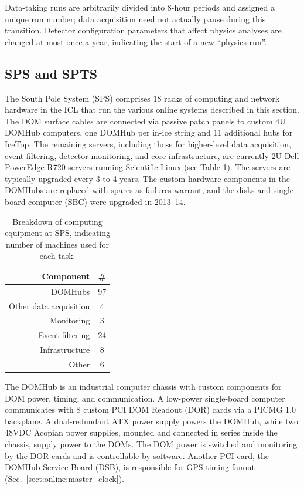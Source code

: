 Data-taking runs are arbitrarily divided into 8-hour periods and assigned
a unique run number; data acquisition need not actually pause during
this transition.  Detector configuration parameters that affect physics
analyses are changed at most once a year, indicating the start of a new
``physics run''.   

\subsection{\label{sect:sps}SPS and SPTS}

The South Pole System (SPS) comprises 18 racks of computing and network
hardware in the ICL that run the various online systems described in this
section.  The DOM surface cables are connected via passive patch panels to
custom 4U DOMHub computers, one DOMHub per in-ice string and 11 additional
hubs for IceTop.  The remaining servers, including those for higher-level
data acquisition, event filtering, detector monitoring, and core
infrastructure, are currently 2U Dell PowerEdge R720 servers running
Scientific Linux (see Table \ref{tab:sps_breakdown}).  The servers are
typically upgraded every 3 to 4 years.  The custom hardware components in
the DOMHubs are replaced with spares as failures warrant, and the disks and
single-board computer (SBC) were upgraded in 2013--14.

\begin{table}[h]
  \centering
  \begin{tabular}{ r | c }
    \bf{Component} & \bf{\#} \\ \hline DOMHubs & 97 \\ Other data
    acquisition & 4 \\
    Monitoring & 3 \\ Event filtering & 24 \\ Infrastructure & 8 \\ Other &
    6 \\
  \end{tabular}
  \caption{Breakdown of computing equipment at SPS, indicating number of
    machines used for each task.}
  \label{tab:sps_breakdown}
\end{table}

The DOMHub is an industrial computer chassis with custom components for DOM
power, timing, and communication.  A low-power single-board computer
communicates with 8 custom PCI DOM Readout (DOR) cards via a PICMG 1.0
backplane.  A dual-redundant ATX power supply powers the DOMHub, while two
48VDC Acopian power supplies, mounted and connected in series inside the
chassis, supply power to the DOMs.  The DOM power is switched and
monitoring by the DOR cards and is controllable by software.  Another PCI
card, the DOMHub Service Board (DSB), is responsible for GPS timing fanout
(Sec.~\ref{sect:online:master_clock}).

